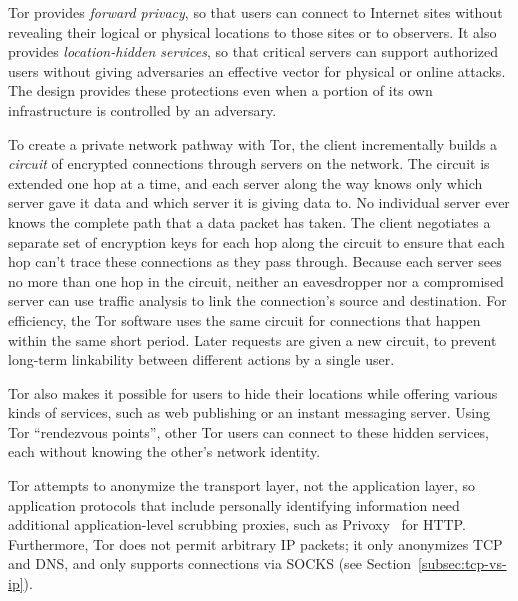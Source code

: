 \documentclass{llncs}
\begin{document}


Tor provides \emph{forward privacy}, so that users can connect to
Internet sites without revealing their logical or physical locations
to those sites or to observers.  It also provides \emph{location-hidden
services}, so that critical servers can support authorized users without
giving adversaries an effective vector for physical or online attacks.
The design provides these protections even when a portion of its own
infrastructure is controlled by an adversary.

To create a private network pathway with Tor, the client
incrementally builds a \emph{circuit} of encrypted connections through
servers on the network. The circuit is extended one hop at a time, and
each server along the way knows only which server gave it data and which
server it is giving data to. No individual server ever knows the complete
path that a data packet has taken. The client negotiates a separate set
of encryption keys for each hop along the circuit to ensure that each
hop can't trace these connections as they pass through.
Because each server sees no more than one hop in the
circuit, neither an eavesdropper nor a compromised server can use traffic
analysis to link the connection's source and destination.
For efficiency, the Tor software uses the same circuit for connections
that happen within the same short period. Later requests are given a new
circuit, to prevent long-term linkability between different actions by
a single user.

Tor also makes it possible for users to hide their locations while
offering various kinds of services, such as web publishing or an instant
messaging server. Using Tor ``rendezvous points'', other Tor users can
connect to these hidden services, each without knowing the other's network
identity.

Tor attempts to anonymize the transport layer, not the application layer, so
application protocols that include personally identifying information need
additional application-level scrubbing proxies, such as
Privoxy~\cite{privoxy} for HTTP.  Furthermore, Tor does not permit arbitrary
IP packets; it only anonymizes TCP and DNS, and only supports connections via
SOCKS (see Section~\ref{subsec:tcp-vs-ip}).
\end{document}
